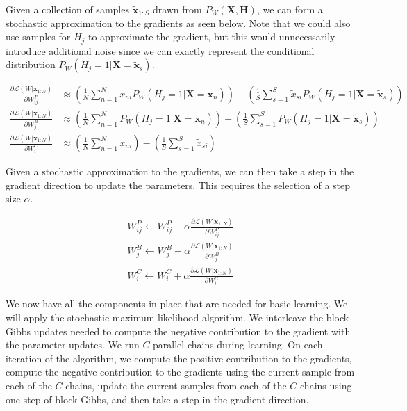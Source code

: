 \documentclass[11pt]{article}
\newcommand{\deriv}[2]{\frac{\partial{#1}}{\partial {#2}} }
\newcommand{\mbf}[1]{{\mathbf{#1}}}
\begin{document}
Given a collection of samples $\tilde{\mbf{x}}_{1:S}$ drawn from $P_W(\mbf{X},\mbf{H})$, we can form a stochastic approximation to the gradients as seen below. Note that we could also use samples for $H_j$ to approximate the gradient, but this would unnecessarily introduce additional noise since we can exactly represent the conditional distribution $P_W(H_j=1|\mbf{X}=\tilde{\mbf{x}}_s)$.

\begin{align}
\label{deriv_approx_WP}
\deriv{\mathcal{L}(W|\mbf{x}_{1:N})}{W^P_{ij}}
&\approx \left(\frac{1}{N}\sum_{n=1}^Nx_{ni}P_W(H_j=1|\mbf{X}=\mbf{x}_n)\right)
-\left(\frac{1}{S}\sum_{s=1}^S\tilde{x}_{si}P_W(H_j=1|\mbf{X}=\tilde{\mbf{x}}_s)\right)\\
%
\label{deriv_approx_WB}
\deriv{\mathcal{L}(W|\mbf{x}_{1:N})}{W^B_{j}}
&\approx \left(\frac{1}{N}\sum_{n=1}^NP_W(H_j=1|\mbf{X}=\mbf{x}_n)\right)
-\left(\frac{1}{S}\sum_{s=1}^SP_W(H_j=1|\mbf{X}=\tilde{\mbf{x}}_s)\right)\\
%
\label{deriv_approx_WC}
\deriv{\mathcal{L}(W|\mbf{x}_{1:N})}{W^C_{i}}
&\approx \left(\frac{1}{N}\sum_{n=1}^N x_{ni}\right)
-\left(\frac{1}{S}\sum_{s=1}^S \tilde{x}_{si}\right)
\end{align}

Given a stochastic approximation to the gradients, we can then take a step in the gradient direction to update the parameters. This requires the selection of a step size $\alpha$.

\begin{align}
\label{update_WP}
W^P_{ij} \leftarrow W^P_{ij} + \alpha \deriv{\mathcal{L}(W|\mbf{x}_{1:N})}{W^P_{ij}}\\
\label{update_WB}
W^B_{j} \leftarrow W^B_{j} + \alpha \deriv{\mathcal{L}(W|\mbf{x}_{1:N})}{W^B_{j}}\\
\label{update_WC}
W^C_{i} \leftarrow W^C_{i} + \alpha \deriv{\mathcal{L}(W|\mbf{x}_{1:N})}{W^C_{i}}
\end{align}

We now have all the components in place that are needed for basic learning. We will apply the stochastic
maximum likelihood algorithm. We interleave the block Gibbs updates needed to compute the negative contribution to the gradient with the parameter updates. We run $C$ parallel chains during learning. On each iteration of the algorithm, we compute the positive contribution to the gradients, compute the negative contribution to the gradients using the current sample from each of the $C$ chains, update the current samples from each of the $C$ chains using one step of block Gibbs, and then take a step in the gradient direction.\\
\end{document}
